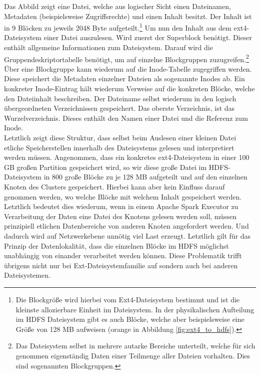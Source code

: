\noindent
Das Abbild zeigt eine Datei, welche aus logischer Sicht einen Dateinamen, Metadaten (beispielsweise Zugriffsrechte) und einen Inhalt besitzt. Der Inhalt ist in 9 Blöcken zu jeweils 2048 Byte aufgeteilt.\footnote{Die Blockgröße wird hierbei vom Ext4-Dateisystem bestimmt und ist die kleinste allozierbare Einheit im Dateisystem. In der physikalischen Aufteilung im HDFS Dateisystem gibt es auch Blöcke, welche aber beispielsweise eine Größe von 128 MB aufweisen (orange in Abbildung \ref{fig:ext4_to_hdfs}).} Um nun den Inhalt aus dem ext4-Dateisystem einer Datei auszulesen. Wird zuerst der Superblock benötigt. Dieser enthält allgemeine Informationen zum Dateisystem. Darauf wird die Gruppendeskriptortabelle benötigt, um auf einzelne Blockgruppen zuzugreifen.\footnote{Das Dateisystem selbst in mehrere autarke Bereiche unterteilt, welche für sich genommen eigenständig Daten einer Teilmenge aller Dateien vorhalten. Dies sind sogenannten Blockgruppen.} Über eine Blockgruppe kann wiederum auf die Inode-Tabelle zugegriffen werden. Diese speichert die Metadaten einzelner Dateien als sogenannte Inodes ab. Ein konkreter Inode-Eintrag hält wiederum Verweise auf die konkreten Blöcke, welche den Dateiinhalt beschreiben. Der Dateiname selbst wiederum in den logisch übergeordneten Verzeichnissen gespeichert. Das oberste Verzeichnis, ist das Wurzelverzeichnis. Dieses enthält den Namen einer Datei und die Referenz zum Inode.\\

\noindent
Letztlich zeigt diese Struktur, dass selbst beim Auslesen einer kleinen Datei etliche Speicherstellen innerhalb des Dateisystems gelesen und interpretiert werden müssen. Angenommen, dass ein konkretes ext4-Dateisystem in einer 100 GB großen Partition gespeichert wird, so wir diese große Datei im HDFS-Dateisystem in 800 große Blöcke zu je 128 MB aufgeteilt und auf den einzelnen Knoten des Clusters gespeichert. Hierbei kann aber kein Einfluss darauf genommen werden, wo welche Blöcke mit welchem Inhalt gespeichert werden. Letztlich bedeutet dies wiederum, wenn in einem Apache Spark Executor zu Verarbeitung der Daten eine Datei des Knotens gelesen werden soll, müssen prinzipiell etlichen Datenbereiche von anderen Knoten angefordert werden. Und dadurch wird auf Netzwerkebene unnötig viel Last erzeugt. Letztlich gilt für das Prinzip der Datenlokalität, dass die einzelnen Blöcke im HDFS möglichst unabhängig von einander verarbeitet werden können. Diese Problematik trifft übrigens nicht nur bei Ext-Dateisystemfamilie auf sondern auch bei anderen Dateisystemen.\\

